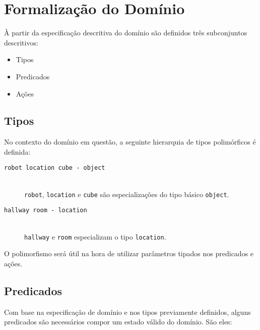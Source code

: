 \documentclass[letterpaper]{article}
\begin{document}
\section{Formalização do Domínio}

À partir da especificação descritiva do domínio são definidos três subconjuntos descritivos:

\begin{itemize}
\item Tipos
\item Predicados
\item Ações
\end{itemize}

\subsection{Tipos}

No contexto do domínio em questão, a seguinte hierarquia de tipos polimórficos é definida:

\begin{description}
\item[\texttt{robot location cube - object}] \hfill\\ \texttt{robot}, \texttt{location} e \texttt{cube} são especializações do tipo básico \texttt{object}.
\item[\texttt{hallway room - location}] \hfill\\ \texttt{hallway} e \texttt{room} especializam o tipo \texttt{location}.
\end{description}

O polimorfismo será útil na hora de utilizar parâmetros tipados nos predicados e ações.

\subsection{Predicados}

Com base na especificação de domínio e nos tipos previamente definidos, alguns predicados são necessários compor um
estado válido do domínio. São eles:
\end{document}
